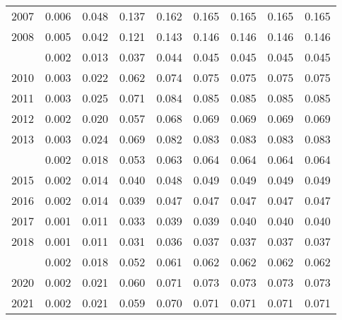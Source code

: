 \documentclass[
]{article}
\begin{document}
\begin{longtable}[t]{lrrrrrrrr}
2007 & 0.006 & 0.048 & 0.137 & 0.162 & 0.165 & 0.165 & 0.165 & 0.165\\
2008 & 0.005 & 0.042 & 0.121 & 0.143 & 0.146 & 0.146 & 0.146 & 0.146\\
\addlinespace
2009 & 0.002 & 0.013 & 0.037 & 0.044 & 0.045 & 0.045 & 0.045 & 0.045\\
2010 & 0.003 & 0.022 & 0.062 & 0.074 & 0.075 & 0.075 & 0.075 & 0.075\\
2011 & 0.003 & 0.025 & 0.071 & 0.084 & 0.085 & 0.085 & 0.085 & 0.085\\
2012 & 0.002 & 0.020 & 0.057 & 0.068 & 0.069 & 0.069 & 0.069 & 0.069\\
2013 & 0.003 & 0.024 & 0.069 & 0.082 & 0.083 & 0.083 & 0.083 & 0.083\\
\addlinespace
2014 & 0.002 & 0.018 & 0.053 & 0.063 & 0.064 & 0.064 & 0.064 & 0.064\\
2015 & 0.002 & 0.014 & 0.040 & 0.048 & 0.049 & 0.049 & 0.049 & 0.049\\
2016 & 0.002 & 0.014 & 0.039 & 0.047 & 0.047 & 0.047 & 0.047 & 0.047\\
2017 & 0.001 & 0.011 & 0.033 & 0.039 & 0.039 & 0.040 & 0.040 & 0.040\\
2018 & 0.001 & 0.011 & 0.031 & 0.036 & 0.037 & 0.037 & 0.037 & 0.037\\
\addlinespace
2019 & 0.002 & 0.018 & 0.052 & 0.061 & 0.062 & 0.062 & 0.062 & 0.062\\
2020 & 0.002 & 0.021 & 0.060 & 0.071 & 0.073 & 0.073 & 0.073 & 0.073\\
2021 & 0.002 & 0.021 & 0.059 & 0.070 & 0.071 & 0.071 & 0.071 & 0.071\\*
\end{longtable}
\end{document}
